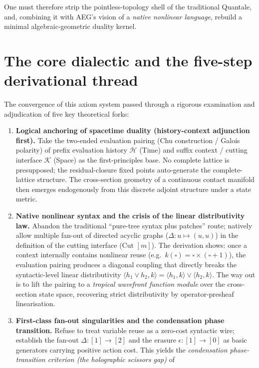 \documentclass[11pt,a4paper]{article}
\theoremstyle{definition}
\theoremstyle{remark}
\newcommand{\cK}{\mathcal{K}}
\newcommand{\cH}{\mathcal{H}}
\begin{document}
One must therefore strip the pointless-topology shell of the traditional
Quantale, and, combining it with AEG's vision of a \emph{native nonlinear
language}, rebuild a minimal algebraic-geometric duality kernel.

\section{The core dialectic and the five-step derivational thread}

The convergence of this axiom system passed through a rigorous examination and
adjudication of five key theoretical forks:

\begin{enumerate}
\item \textbf{Logical anchoring of spacetime duality (history-context adjunction
first).}  Take the two-ended evaluation pairing (Chu construction / Galois
polarity) of prefix evaluation history $\cH$ (Time) and suffix context / cutting
interface $\cK$ (Space) as the first-principles base.  No complete lattice is
presupposed; the residual-closure fixed points auto-generate the complete-lattice
structure.  The cross-section geometry of a continuous contact manifold then
emerges endogenously from this discrete adjoint structure under a state metric.
\item \textbf{Native nonlinear syntax and the crisis of the linear distributivity
law.}  Abandon the traditional ``pure-tree syntax plus patches'' route; natively
allow multiple fan-out of directed acyclic graphs ($\Delta: u \mapsto (u, u)$) in
the definition of the cutting interface (Cut $[m]$).  The derivation shows: once a
context internally contains nonlinear reuse (e.g.\
$k(\square) = \square \times (\square + 1)$), the evaluation pairing produces a
diagonal coupling that directly breaks the syntactic-level linear distributivity
$\langle h_1 \vee h_2, k \rangle = \langle h_1, k \rangle \vee \langle h_2, k
\rangle$.  The way out is to lift the pairing to a \emph{tropical wavefront
function module} over the cross-section state space, recovering strict
distributivity by operator-presheaf linearisation.
\item \textbf{First-class fan-out singularities and the condensation phase
transition.}  Refuse to treat variable reuse as a zero-cost syntactic wire;
establish the fan-out $\Delta: [1] \to [2]$ and the erasure $\epsilon: [1] \to
[0]$ as basic generators carrying positive action cost.  This yields the
\emph{condensation phase-transition criterion (the holographic scissors gap)} of

\end{enumerate}
\end{document}
